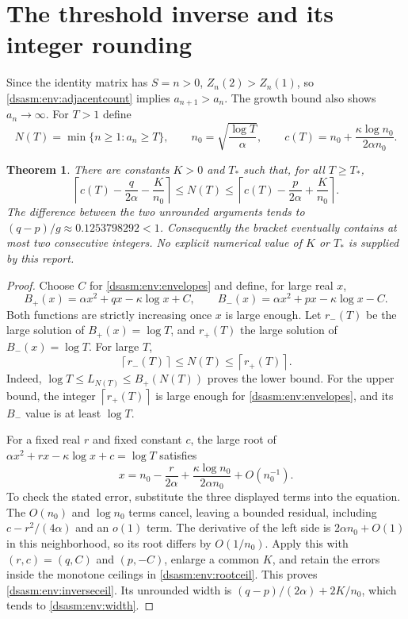 \documentclass[11pt,letterpaper]{article}
\newtheorem{theorem}{Theorem}[section]
\theoremstyle{remark}\newtheorem{remark}[theorem]{Remark}
\newcommand{\ceil}[1]{\left\lceil#1\right\rceil}
\begin{document}
\section{The threshold inverse and its integer rounding}
\label{dsasm:env:sec:inverse}
Since the identity matrix has $S=n>0$,
$Z_n(2)>Z_n(1)$, so \eqref{dsasm:env:adjacentcount} implies
$a_{n+1}>a_n$. The growth bound also shows $a_n\to\infty$.
For $T>1$ define
\[
 N(T)=\min\{n\ge1:a_n\ge T\},\qquad
 n_0=\sqrt{\frac{\log T}{\alpha}},\qquad
 c(T)=n_0+\frac{\kappa\log n_0}{2\alpha n_0}.
\]
\begin{theorem}\label{dsasm:env:inverse}
There are constants $K>0$ and $T_*$ such that, for all $T\ge T_*$,
\begin{equation}\label{dsasm:env:inverseceil}
 \ceil{c(T)-\frac{q}{2\alpha}-\frac K{n_0}}
 \le N(T)\le
 \ceil{c(T)-\frac{p}{2\alpha}+\frac K{n_0}}.
\end{equation}
The difference between the two unrounded arguments tends to
$(q-p)/g\approx0.1253798292<1$. Consequently the bracket eventually
contains at most two consecutive integers. No explicit numerical
value of $K$ or $T_*$ is supplied by this report.
\end{theorem}
\begin{proof}
Choose $C$ for \eqref{dsasm:env:envelopes} and define, for large real $x$,
\[
 B_+(x)=\alpha x^2+qx-\kappa\log x+C,\qquad
 B_-(x)=\alpha x^2+px-\kappa\log x-C.
\]
Both functions are strictly increasing once $x$ is large enough.
Let $r_-(T)$ be the large solution of $B_+(x)=\log T$, and
$r_+(T)$ the large solution of $B_-(x)=\log T$. For large $T$,
\begin{equation}\label{dsasm:env:rootceil}
 \ceil{r_-(T)}\le N(T)\le\ceil{r_+(T)}.
\end{equation}
Indeed, $\log T\le L_{N(T)}\le B_+(N(T))$ proves the lower bound.
For the upper bound, the integer $\ceil{r_+(T)}$ is large enough for
\eqref{dsasm:env:envelopes}, and its $B_-$ value is at least $\log T$.

For a fixed real $r$ and fixed constant $c$, the large root of
$\alpha x^2+rx-\kappa\log x+c=\log T$ satisfies
\begin{equation}\label{dsasm:env:scalarinverse}
 x=n_0-\frac r{2\alpha}
       +\frac{\kappa\log n_0}{2\alpha n_0}+O(n_0^{-1}).
\end{equation}
To check the stated error, substitute the three displayed terms into
the equation. The $O(n_0)$ and $\log n_0$ terms cancel, leaving a
bounded residual, including $c-r^2/(4\alpha)$ and an $o(1)$ term.
The derivative of the left side is $2\alpha n_0+O(1)$ in this
neighborhood, so its root differs by $O(1/n_0)$.
Apply this with $(r,c)=(q,C)$ and $(p,-C)$, enlarge a common $K$,
and retain the errors inside the monotone ceilings in \eqref{dsasm:env:rootceil}.
This proves \eqref{dsasm:env:inverseceil}. Its unrounded width is
$(q-p)/(2\alpha)+2K/n_0$, which tends to \eqref{dsasm:env:width}.
\end{proof}
\end{document}
